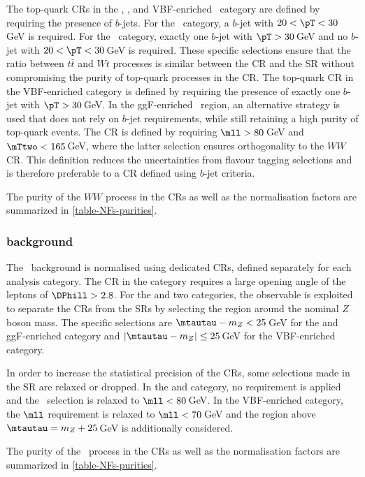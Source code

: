 The top-quark CRs in the \ZeroJet, \OneJet, and VBF-enriched \TwoJet\ category are defined by requiring the presence of $b$-jets.
For the \ZeroJet\ category, a $b$-jet with $20 < \pT < 30\,$GeV is required.
For the \OneJet\ category, exactly one $b$-jet with $\pT > 30\,$GeV and no $b$-jet with $20 < \pT < 30\,$GeV is required. These specific selections ensure that the ratio between $t\bar{t}$ and $Wt$ processes is similar between the CR and the SR without compromising the purity of top-quark processes in the CR.
The top-quark CR in the VBF-enriched \TwoJet category is defined by requiring the presence of exactly one $b$-jet with $\pT > 30\,$GeV.
In the ggF-enriched \TwoJet\ region, an alternative strategy is used that does not rely on $b$-jet requirements, while still retaining a high purity of top-quark events. The CR is defined by requiring $\mll > 80\,$GeV and $\mTtwo < 165\,$GeV, where the latter selection ensures orthogonality to the $WW$ CR. This definition reduces the uncertainties from flavour tagging selections and is therefore preferable to a CR defined using $b$-jet criteria.

The purity of the $WW$ process in the CRs as well as the normalisation factors are summarized in \cref{table-NFs-purities}.

\subsubsection{\Ztautau background}
The \Ztautau\ background is normalised using dedicated CRs, defined separately for each analysis category.
The CR in the \ZeroJet category requires a large opening angle of the leptons of $\DPhill > 2.8$.
For the \OneJet and two \TwoJet categories, the \mtautau observable is exploited to separate the \Ztautau CRs from the SRs by selecting the region around the nominal $Z$ boson mass.
The specific selections are $\mtautau - m_Z < 25\,$GeV for the \OneJet and ggF-enriched \TwoJet category and $|\mtautau - m_Z| \le 25\,$GeV for the VBF-enriched \TwoJet category.

In order to increase the statistical precision of the CRs, some selections made in the SR are relaxed or dropped.
In the \ZeroJet and \OneJet category, no \pTmiss requirement is applied and the \mll\ selection is relaxed to $\mll < 80\,$GeV.
In the VBF-enriched \TwoJet category, the $\mll$ requirement is relaxed to $\mll < 70\,$GeV and the region above $\mtautau = m_Z + 25\,$GeV is additionally considered.

The purity of the \Ztautau\ process in the CRs as well as the normalisation factors are summarized in \cref{table-NFs-purities}.

